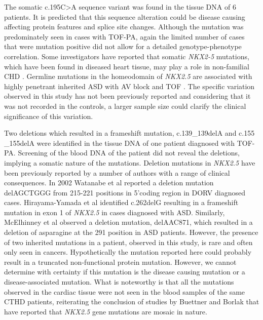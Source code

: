 \begin{refsection}
The somatic c.195C>A sequence variant was found in the tissue DNA of 6 patients. It is predicted that this sequence alteration could be disease causing affecting protein features and splice site changes. Although the mutation was predominately seen in cases with TOF-PA, again the limited number of cases that were mutation positive did not allow for a detailed genotype-phenotype correlation. Some investigators have reported that somatic \textit{NKX2-5} mutations, which have been found in diseased heart tissue, may play a role in non-familial CHD \cite{reamon2004somatic,reamon2004novel,inga2005functional}. Germline mutations in the homeodomain of \textit{NKX2.5} are associated with highly penetrant inherited ASD with AV block \cite{mcelhinney2003nkx2,sarkozy2005spectrum} and TOF \cite{goldmuntz2001nkx2}. The specific variation observed in this study has not been previously reported and considering that it was not recorded in the controls, a larger sample size could clarify the clinical significance of this variation.

\begin{sloppypar} Two deletions which resulted in a frameshift mutation, c.139\_139delA and c.155
\_155delA were identified in the tissue DNA of one patient diagnosed with TOF-PA. Screening of the blood DNA of the patient did not reveal the deletions, implying a somatic nature of the mutations. Deletion mutations in \textit{NKX2.5} have been previously reported by a number of authors with a range of clinical consequences. In 2002 Watanabe et al \cite{watanabe2002two} reported a deletion mutation delAGCTGGG from 215-221 positions in 5’coding region in DORV diagnosed cases. Hirayama-Yamada et al \cite{hirayama2005phenotypes} identified c.262delG resulting in a frameshift mutation in exon 1 of \textit{NKX2.5} in cases diagnosed with ASD. Similarly, McElhinney et al \cite{mcelhinney2003nkx2} observed a deletion mutation, delAAC871, which resulted in a deletion of asparagine at the 291 position in ASD patients. However, the presence of two inherited mutations in a patient, observed in this study, is rare and often only seen in cancers. Hypothetically the mutation reported here could probably result in a truncated non-functional protein mutation. However, we cannot determine with certainty if this mutation is the disease causing mutation or a disease-associated mutation. What is noteworthy is that all the mutations observed in the cardiac tissue were not seen in the blood samples of the same CTHD patients, reiterating the conclusion of studies by Buettner and Borlak \cite{reamon2004somatic,reamon2004novel,inga2005functional} that have reported that \textit{NKX2.5} gene mutations are mosaic in nature. \end{sloppypar}


\end{refsection}
